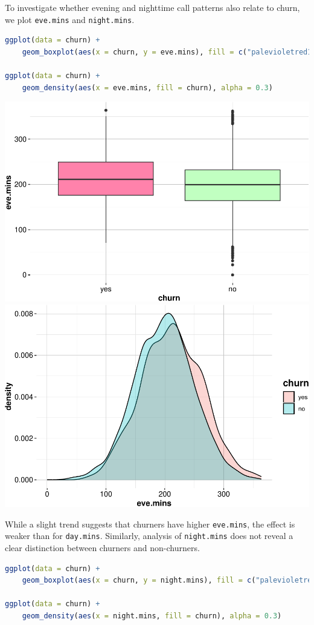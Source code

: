 \documentclass[
]{book}
\newcommand{\passthrough}[1]{#1}
\theoremstyle{definition}
\theoremstyle{definition}
\theoremstyle{definition}
\theoremstyle{definition}
\theoremstyle{remark}
\begin{document}
To investigate whether evening and nighttime call patterns also relate to churn, we plot \passthrough{\lstinline!eve.mins!} and \passthrough{\lstinline!night.mins!}.

\begin{lstlisting}[language=R]
ggplot(data = churn) +
    geom_boxplot(aes(x = churn, y = eve.mins), fill = c("palevioletred1", "darkseagreen1"))

ggplot(data = churn) +
    geom_density(aes(x = eve.mins, fill = churn), alpha = 0.3)
\end{lstlisting}

\includegraphics[width=0.5\linewidth]{EDA_files/figure-latex/unnamed-chunk-12-1} \includegraphics[width=0.5\linewidth]{EDA_files/figure-latex/unnamed-chunk-12-2}

While a slight trend suggests that churners have higher \passthrough{\lstinline!eve.mins!}, the effect is weaker than for \passthrough{\lstinline!day.mins!}. Similarly, analysis of \passthrough{\lstinline!night.mins!} does not reveal a clear distinction between churners and non-churners.

\begin{lstlisting}[language=R]
ggplot(data = churn) +
    geom_boxplot(aes(x = churn, y = night.mins), fill = c("palevioletred1", "darkseagreen1"))

ggplot(data = churn) +
    geom_density(aes(x = night.mins, fill = churn), alpha = 0.3)
\end{lstlisting}
\end{document}
